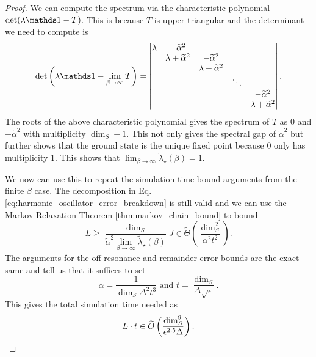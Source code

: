 \begin{proof}
We can compute the spectrum via the characteristic polynomial $\det(\lambda \identity - T)$. This is because $T$ is upper triangular and the determinant we need to compute is
\begin{equation}
    \det \left(\lambda \identity - \lim_{\beta \to \infty} T \right) =  \begin{vmatrix}
        \lambda & -\widetilde{\alpha}^2 &   &\\
        & \lambda + \widetilde{\alpha}^2 & -\widetilde{\alpha}^2 &  &\\
        & & \lambda + \widetilde{\alpha}^2  & & \\
        & & & \ddots & \\
        & &     &       & -\widetilde{\alpha}^2 \\
        & &  & & \lambda + \widetilde{\alpha}^2
    \end{vmatrix}.
\end{equation}
    The roots of the above characteristic polynomial gives the spectrum of $T$ as 0 and $-\widetilde{\alpha}^2$ with multiplicity $\dim_S - 1$. This not only gives the spectral gap of $\widetilde{\alpha}^2$ but further shows that the ground state is the unique fixed point because 0 only has multiplicity 1. This shows that $\lim_{\beta \to \infty} \widetilde{\lambda}_\star(\beta) = 1$.

    We now can use this to repeat the simulation time bound arguments from the finite $\beta$ case. The decomposition in Eq. \eqref{eq:harmonic_oscillator_error_breakdown} is still valid and we can use the Markov Relaxation Theorem \ref{thm:markov_chain_bound} to bound
    \begin{equation}
        L \ge \frac{\dim_S}{\widetilde{\alpha}^2\lim_{\beta \to \infty} \widetilde{\lambda}_\star(\beta)} J \in \widetilde{\Theta}\left({\frac{\dim_S^2}{\alpha^2 t^2}}\right).
    \end{equation}
    The arguments for the off-resonance and remainder error bounds are the exact same and tell us that it suffices to set
    \begin{equation}
        \alpha = \frac{1}{\dim_S \Delta^2 t^3} \text{ and } t = \frac{\dim_S}{\Delta \sqrt{\epsilon}}.
    \end{equation}
    This gives the total simulation time needed as
    \begin{equation}
        L\cdot t \in \widetilde{O} \left( \frac{\dim_S^9}{\epsilon^{2.5} \Delta} \right).
    \end{equation}
\end{proof}

